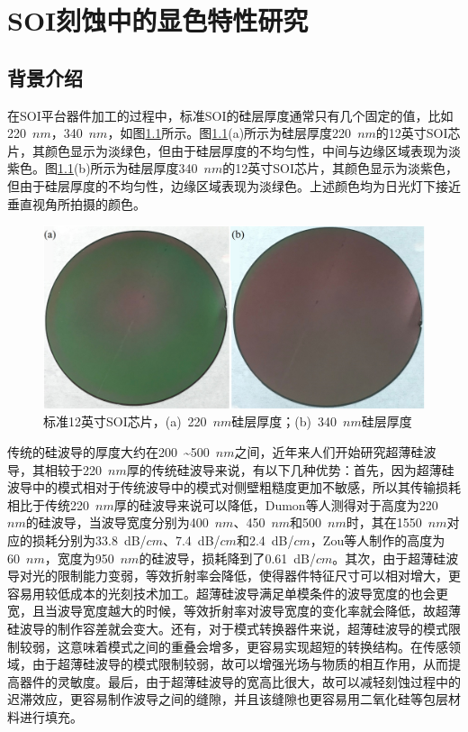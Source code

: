 \chapter{SOI刻蚀中的显色特性研究}
\section{背景介绍}

在SOI平台器件加工的过程中，标准SOI的硅层厚度通常只有几个固定的值，比如220~$nm$，340~$nm$，如图\ref{color_wafer}所示。图\ref{color_wafer}(a)所示为硅层厚度220~$nm$的12英寸SOI芯片，其颜色显示为淡绿色，但由于硅层厚度的不均匀性，中间与边缘区域表现为淡紫色。图\ref{color_wafer}(b)所示为硅层厚度340~$nm$的12英寸SOI芯片，其颜色显示为淡紫色，但由于硅层厚度的不均匀性，边缘区域表现为淡绿色。上述颜色均为日光灯下接近垂直视角所拍摄的颜色。

\begin{figure}[htb]
	\centering
	\includegraphics[width=14cm]{./Pictures/color_wafer.jpg}
	\captionsetup{justification=centering}
	\caption{标准12英寸SOI芯片，(a)~220~$nm$硅层厚度；(b)~340~$nm$硅层厚度}
	\label{color_wafer}
\end{figure}

传统的硅波导的厚度大约在200~\~{}500~$nm$之间，近年来人们开始研究超薄硅波导，其相较于220~$nm$厚的传统硅波导来说，有以下几种优势：首先，因为超薄硅波导中的模式相对于传统波导中的模式对侧壁粗糙度更加不敏感，所以其传输损耗相比于传统220~$nm$厚的硅波导来说可以降低，Dumon等人测得对于高度为220~$nm$的硅波导，当波导宽度分别为400~$nm$、450~$nm$和500~$nm$时，其在1550~$nm$对应的损耗分别为33.8~dB/$cm$、7.4~dB/$cm$和2.4~dB/$cm$\cite{dumon2004low}，Zou等人制作的高度为60~$nm$，宽度为950~$nm$的硅波导，损耗降到了0.61~dB/$cm$\cite{zou201560}。其次，由于超薄硅波导对光的限制能力变弱，等效折射率会降低，使得器件特征尺寸可以相对增大，更容易用较低成本的光刻技术加工\cite{zou201560}。超薄硅波导满足单模条件的波导宽度的也会更宽，且当波导宽度越大的时候，等效折射率对波导宽度的变化率就会降低，故超薄硅波导的制作容差就会变大。还有，对于模式转换器件来说，超薄硅波导的模式限制较弱，这意味着模式之间的重叠会增多，更容易实现超短的转换结构。在传感领域，由于超薄硅波导的模式限制较弱，故可以增强光场与物质的相互作用，从而提高器件的灵敏度。最后，由于超薄硅波导的宽高比很大，故可以减轻刻蚀过程中的迟滞效应\cite{jansen1997bsm}，更容易制作波导之间的缝隙，并且该缝隙也更容易用二氧化硅等包层材料进行填充。

